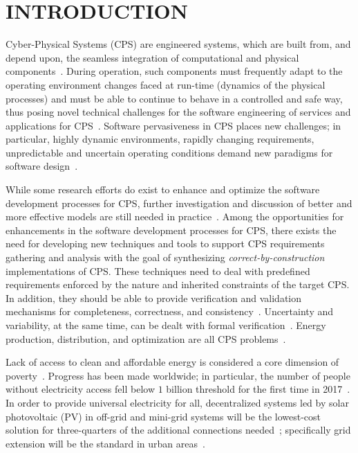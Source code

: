 \documentclass[review]{elsarticle}
\begin{document}

\section{INTRODUCTION}
Cyber-Physical Systems (CPS) are engineered systems, which are built from, and depend upon, the seamless integration of computational and physical  components~\cite{NSF2015}. During operation, such components must frequently adapt to the operating environment changes faced at run-time (dynamics of the physical processes) and must be able to continue to behave in a controlled and safe way, thus posing novel technical challenges for the software engineering of services and applications for CPS~\cite{Metzger2014}. Software pervasiveness in CPS places new challenges; in particular, highly dynamic environments, rapidly changing requirements, unpredictable and uncertain operating conditions demand new paradigms for software design~\cite{Filieri2015}.

While some research efforts do exist to enhance and optimize the software development processes for CPS, further investigation and discussion of better and more effective models are still needed in practice~\cite{Al-Jaroodi2016}. Among the opportunities for enhancements in the software development processes for CPS, there exists the need for developing new techniques and tools to support CPS requirements gathering and analysis with the goal of synthesizing \textit{correct-by-construction} implementations of CPS. These techniques need to deal with predefined requirements enforced by the nature and inherited constraints of the target CPS. In addition, they should be able to provide verification and validation mechanisms for completeness, correctness, and consistency~\cite{Al-Jaroodi2016}. Uncertainty and variability, at the same time, can be dealt with formal verification~\cite{NESSI}. Energy production, distribution, and optimization are all CPS problems~\cite{UC}. 

Lack of access to clean and affordable energy is considered a core dimension of poverty~\cite{Hussein2012}. Progress has been made worldwide; in particular, the number of people without electricity access fell below $1$ billion threshold for the first time in 2017~\cite{IEAweo2018}. In order to provide universal electricity for all, decentralized systems led by solar photovoltaic (PV) in off-grid and mini-grid systems will be the lowest-cost solution for three-quarters of the additional connections needed~\cite{Hussein2012}; specifically grid extension will be the standard in urban areas~\cite{IEAweo2018}.
\end{document}
